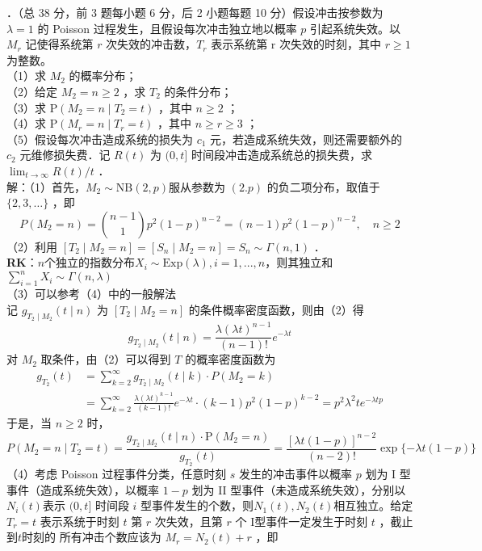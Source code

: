 \documentclass[UTF8,openany]{book}
\begin{document}
．（总 38 分，前 3 题每小题 6 分，后 2 小题每题 10 分）假设冲击按参数为 $\lambda=1$ 的 Poisson 过程发生，且假设每次冲击独立地以概率 $p$ 引起系统失效。以 $M_{r}$ 记使得系统第 $r$ 次失效的冲击数，$T_{r}$ 表示系统第 r 次失效的时刻，其中 $r \geq 1$ 为整数。\\
（1）求 $M_{2}$ 的概率分布；\\
（2）给定 $M_{2}=n \geq 2$ ，求 $T_{2}$ 的条件分布；\\
（3）求 $\mathrm{P}\left(M_{2}=n \mid T_{2}=t\right)$ ，其中 $n \geq 2$ ；\\
（4）求 $\mathrm{P}\left(M_{r}=n \mid T_{r}=t\right)$ ，其中 $n \geq r \geq 3$ ；\\
（5）假设每次冲击造成系统的损失为 $c_{1}$ 元，若造成系统失效，则还需要额外的 $c_{2}$ 元维修损失费．记 $R(t)$ 为 $(0, t]$ 时间段冲击造成系统总的损失费，求 $\lim _{t \rightarrow \infty} R(t) / t$ ．\\
解：（1）首先，$M_{2} \sim \mathrm{NB}(2, p)$服从参数为 $(2 . p)$ 的负二项分布，取值于 $\{2,3, \ldots\}$ ，即
$$
P\left(M_{2}=n\right)=\binom{n-1}{1} p^{2}(1-p)^{n-2}=(n-1) p^{2}(1-p)^{n-2}, \quad n \geq 2
$$
（2）利用 $\left[T_{2} \mid M_{2}=n\right]=\left[S_{n} \mid M_{2}=n\right]=S_{n} \sim \Gamma(n, 1)$ ．\\
\textbf{RK}：$n$个独立的指数分布$X_i \sim \mathrm{Exp}(\lambda),i=1,...,n$，则其独立和$\sum_{i=1}^n X_i \sim \Gamma\left(n,\lambda \right) $\\
（3）可以参考（4）中的一般解法\\
记 $g_{T_{2} \mid M_{2}}(t \mid n)$ 为 $\left[T_{2} \mid M_{2}=n\right]$ 的条件概率密度函数，则由（2）得
$$
g_{T_{2} \mid M_{2}}(t \mid n)=\frac{\lambda(\lambda t)^{n-1}}{(n-1)!} e^{-\lambda t}
$$
对 $M_{2}$ 取条件，由（2）可以得到 $T$ 的概率密度函数为
$$
\begin{aligned}
	g_{T_{2}}(t) & =\sum_{k=2}^{\infty} g_{T_{2} \mid M_{2}}(t \mid k) \cdot P\left(M_{2}=k\right) \\
	& =\sum_{k=2}^{\infty} \frac{\lambda(\lambda t)^{k-1}}{(k-1)!} e^{-\lambda t} \cdot(k-1) p^{2}(1-p)^{k-2}=p^{2} \lambda^{2} t e^{-\lambda t p}
\end{aligned}
$$
于是，当 $n \geq 2$ 时，
$$
P\left(M_{2}=n \mid T_{2}=t\right)=\frac{g_{T_{2} \mid M_{2}}(t \mid n) \cdot \mathrm{P}\left(M_{2}=n\right)}{g_{T_{2}}(t)}=\frac{[\lambda t(1-p)]^{n-2}}{(n-2)!} \exp \{-\lambda t(1-p)\}
$$
（4）考虑 Poisson 过程事件分类，任意时刻 $s$ 发生的冲击事件以概率 $p$ 划为 I 型事件（造成系统失效），以概率 $1-p$ 划为 II 型事件（未造成系统失效），分别以 $N_{i}(t)$表示 $(0, t]$ 时间段 $i$ 型事件发生的个数，则$N_1(t),N_2(t)$相互独立。给定 $T_{r}=t$ 表示系统于时刻 $t$ 第 $r$ 次失效，且第 $r$ 个 I型事件一定发生于时刻 $t$ ，截止到$t$时刻的 所有冲击个数应该为 $M_r=N_{2}(t)+r$ ，即
\end{document}

